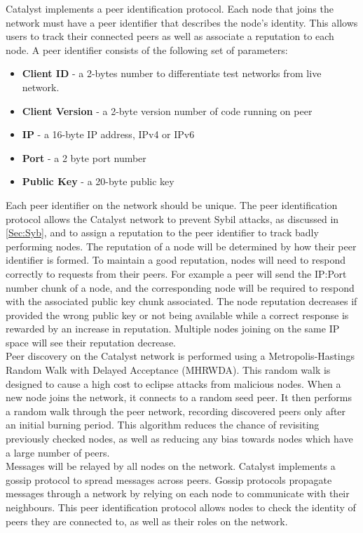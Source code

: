 Catalyst implements a peer identification protocol. Each node that joins the network must have a peer identifier that describes the node’s identity. This allows users to track their connected peers as well as associate a reputation to each node. A peer identifier consists of the following set of parameters:

\begin{itemize}
\item \textbf{Client ID} - a 2-bytes number to differentiate test networks from live network.
\item \textbf{Client Version} - a 2-byte version number of code running on peer 
\item \textbf{IP} -  a 16-byte IP address, IPv4 or IPv6
\item \textbf{Port} - a 2 byte port number 
\item \textbf{Public Key} - a 20-byte public key
\end{itemize}  

Each peer identifier on the network should be unique. The peer identification protocol allows the Catalyst network to prevent Sybil attacks, as discussed in \ref{Sec:Syb}, and to assign a reputation to the peer identifier to track badly performing nodes. The reputation of a node will be determined by how their peer identifier is formed. To maintain a good reputation, nodes will need to respond correctly to requests from their peers. For example a peer will send the IP:Port number chunk of a node, and the corresponding node will be required to respond with the associated public key chunk associated. The node reputation decreases if provided the wrong public key or not being available while a correct response is rewarded by an increase in reputation. Multiple nodes joining on the same IP space will see their reputation decrease. \\

Peer discovery on the Catalyst network is performed using a Metropolis-Hastings Random Walk with Delayed Acceptance (MHRWDA). This random walk is designed to cause a high cost to eclipse attacks from malicious nodes. When a new node joins the network, it connects to a random seed peer. It then performs a random walk through the peer network, recording discovered peers only after an initial burning period. This algorithm reduces the chance of revisiting previously checked nodes, as well as reducing any bias towards nodes which have a large number of peers. \\

Messages will be relayed by all nodes on the network. Catalyst implements a gossip protocol to spread messages across peers. Gossip protocols propagate messages through a network by relying on each node to communicate with their neighbours. This peer identification protocol allows nodes to check the identity of peers they are connected to, as well as their roles on the network. 